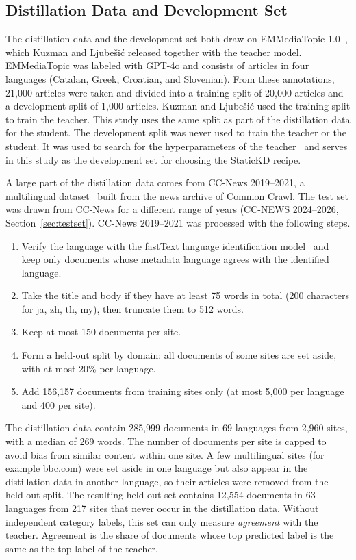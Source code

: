 \documentclass[journal]{IEEEtran}
\begin{document}
\subsection{Distillation Data and Development Set}
\label{sec:distdata}
The distillation data and the development set both draw on EMMediaTopic 1.0~\cite{emmediatopic2025,kuzman2025llm}, which Kuzman and Ljube\v{s}i\'c released together with the teacher model. EMMediaTopic was labeled with GPT-4o and consists of articles in four languages (Catalan, Greek, Croatian, and Slovenian). From these annotations, 21,000 articles were taken and divided into a training split of 20,000 articles and a development split of 1,000 articles. Kuzman and Ljube\v{s}i\'c used the training split to train the teacher. This study uses the same split as part of the distillation data for the student. The development split was never used to train the teacher or the student. It was used to search for the hyperparameters of the teacher~\cite{kuzman2025llm} and serves in this study as the development set for choosing the StaticKD recipe.

A large part of the distillation data comes from CC-News 2019--2021, a multilingual dataset~\cite{cloversearch_ccnews} built from the news archive of Common Crawl. The test set was drawn from CC-News for a different range of years (CC-NEWS 2024--2026, Section~\ref{sec:testset}). CC-News 2019--2021 was processed with the following steps.
\begin{enumerate}
  \item Verify the language with the fastText language identification model~\cite{joulin2017bag} and keep only documents whose metadata language agrees with the identified language.
  \item Take the title and body if they have at least 75 words in total (200 characters for ja, zh, th, my), then truncate them to 512 words.
  \item Keep at most 150 documents per site.
  \item Form a held-out split by domain: all documents of some sites are set aside, with at most 20\% per language.
  \item Add 156,157 documents from training sites only (at most 5,000 per language and 400 per site).
\end{enumerate}
The distillation data contain 285,999 documents in 69 languages from 2,960 sites, with a median of 269 words. The number of documents per site is capped to avoid bias from similar content within one site. A few multilingual sites (for example bbc.com) were set aside in one language but also appear in the distillation data in another language, so their articles were removed from the held-out split. The resulting held-out set contains 12,554 documents in 63 languages from 217 sites that never occur in the distillation data. Without independent category labels, this set can only measure \emph{agreement} with the teacher. Agreement is the share of documents whose top predicted label is the same as the top label of the teacher.
\end{document}
